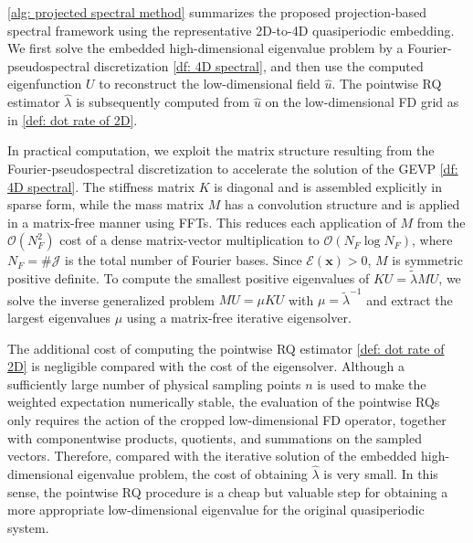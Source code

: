 \documentclass[11pt]{article}
\numberwithin{equation}{section}
\begin{document}
\cref{alg: projected spectral method} summarizes the proposed projection-based spectral framework using the representative 2D-to-4D quasiperiodic embedding. We first solve the embedded high-dimensional eigenvalue problem by a Fourier-pseudospectral discretization \eqref{df: 4D spectral}, and then use the computed eigenfunction $U$ to reconstruct the low-dimensional field $\widehat{u}$. The pointwise RQ estimator $\widehat{\lambda}$ is subsequently computed from $\widehat u$ on the low-dimensional FD grid as in \eqref{def: dot rate of 2D}.

In practical computation, we exploit the matrix structure resulting from the Fourier-pseudospectral discretization to accelerate the solution of the GEVP \eqref{df: 4D spectral}. The stiffness matrix $K$ is diagonal and is assembled explicitly in sparse form, while the mass matrix $M$ has a convolution structure and is applied in a matrix-free manner using FFTs. This reduces each application of $M$ from the $\mathcal{O} (N_F^2)$ cost of a dense matrix-vector multiplication to $\mathcal{O} (N_F\log N_F)$, where $N_F=\#\mathcal{J}$ is the total number of  Fourier bases. Since $\mathcal{E}(\mathbf{x})>0$, $M$ is symmetric positive definite. To compute the smallest positive eigenvalues of $KU=\widetilde{\lambda}MU$, we solve the inverse generalized problem $MU=\mu KU$ with $\mu=\widetilde{\lambda}^{-1}$ and extract the largest eigenvalues $\mu$ using a matrix-free iterative eigensolver.

The additional cost of computing the pointwise RQ estimator \eqref{def: dot rate of 2D} is negligible compared with the cost of the eigensolver. Although a sufficiently large number of physical sampling points $n$ is used to make the weighted expectation numerically stable, the evaluation of the pointwise RQs only requires the action of the cropped low-dimensional FD operator, together with componentwise products, quotients, and summations on the sampled vectors. Therefore, compared with the iterative solution of the embedded high-dimensional eigenvalue problem, the cost of obtaining $\widehat{\lambda}$ is very small. In this sense, the pointwise RQ procedure is a cheap but valuable  step for obtaining a more appropriate low-dimensional eigenvalue for the original quasiperiodic system.
\end{document}

